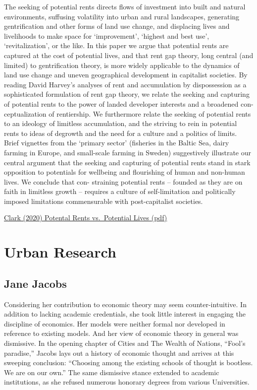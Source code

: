 \documentclass[
]{book}
\begin{document}
The seeking of potential rents directs flows of investment into built and natural environments,
suffusing volatility into urban and rural landscapes, generating gentrification and other forms of
land use change, and displacing lives and livelihoods to make space for `improvement', `highest and
best use', `revitalization', or the like. In this paper we argue that potential rents are captured at
the cost of potential lives, and that rent gap theory, long central (and limited) to gentrification
theory, is more widely applicable to the dynamics of land use change and uneven geographical
development in capitalist societies. By reading David Harvey's analyses of rent and accumulation
by dispossession as a sophisticated formulation of rent gap theory, we relate the seeking and
capturing of potential rents to the power of landed developer interests and a broadened con-
ceptualization of rentiership. We furthermore relate the seeking of potential rents to an ideology
of limitless accumulation, and the striving to rein in potential rents to ideas of degrowth and the
need for a culture and a politics of limits. Brief vignettes from the `primary sector' (fisheries in the
Baltic Sea, dairy farming in Europe, and small-scale farming in Sweden) suggestively illustrate our
central argument that the seeking and capturing of potential rents stand in stark opposition to
potentials for wellbeing and flourishing of human and non-human lives. We conclude that con-
straining potential rents -- founded as they are on faith in limitless growth -- requires a culture of
self-limitation and politically imposed limitations commensurable with post-capitalist societies.

\href{pdf/Clark_2020_Rent_Gap.pdf}{Clark (2020) Potental Rents vs.~Potential Lives (pdf)}

\hypertarget{urban-research}{%
\chapter{Urban Research}\label{urban-research}}

\hypertarget{jane-jacobs}{%
\section{Jane Jacobs}\label{jane-jacobs}}

Considering her contribution to economic theory may seem counter-intuitive. In addition to lacking academic credentials, she took little interest in engaging the discipline of economics. Her models were neither formal nor developed in reference to existing models. And her view of economic theory in general was dismissive. In the opening chapter of Cities and The Wealth of Nations, ``Fool's paradise,'' Jacobs lays out a history of economic thought and arrives at this sweeping conclusion: ``Choosing among the existing schools of thought is bootless. We are on our own.'' The same dismissive stance extended to academic institutions, as she refused numerous honorary degrees from various Universities.
\end{document}
